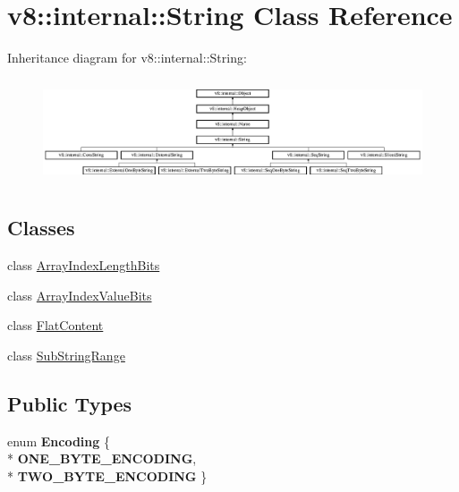 \hypertarget{classv8_1_1internal_1_1_string}{}\section{v8\+:\+:internal\+:\+:String Class Reference}
\label{classv8_1_1internal_1_1_string}
Inheritance diagram for v8\+:\+:internal\+:\+:String\+:\begin{figure}[H]
\begin{center}
\leavevmode
\includegraphics[height=3.111111cm]{classv8_1_1internal_1_1_string}
\end{center}
\end{figure}
\subsection*{Classes}
\begin{DoxyCompactItemize}
\item 
class \hyperlink{classv8_1_1internal_1_1_string_1_1_array_index_length_bits}{Array\+Index\+Length\+Bits}
\item 
class \hyperlink{classv8_1_1internal_1_1_string_1_1_array_index_value_bits}{Array\+Index\+Value\+Bits}
\item 
class \hyperlink{classv8_1_1internal_1_1_string_1_1_flat_content}{Flat\+Content}
\item 
class \hyperlink{classv8_1_1internal_1_1_string_1_1_sub_string_range}{Sub\+String\+Range}
\end{DoxyCompactItemize}
\subsection*{Public Types}
\begin{DoxyCompactItemize}
\item 
enum {\bfseries Encoding} \{ \\*
{\bfseries O\+N\+E\+\_\+\+B\+Y\+T\+E\+\_\+\+E\+N\+C\+O\+D\+I\+NG}, 
\\*
{\bfseries T\+W\+O\+\_\+\+B\+Y\+T\+E\+\_\+\+E\+N\+C\+O\+D\+I\+NG}
 \}\hypertarget{classv8_1_1internal_1_1_string_a538c62114120f52395d17c186574b6db}{}\label{classv8_1_1internal_1_1_string_a538c62114120f52395d17c186574b6db}

\end{DoxyCompactItemize}
